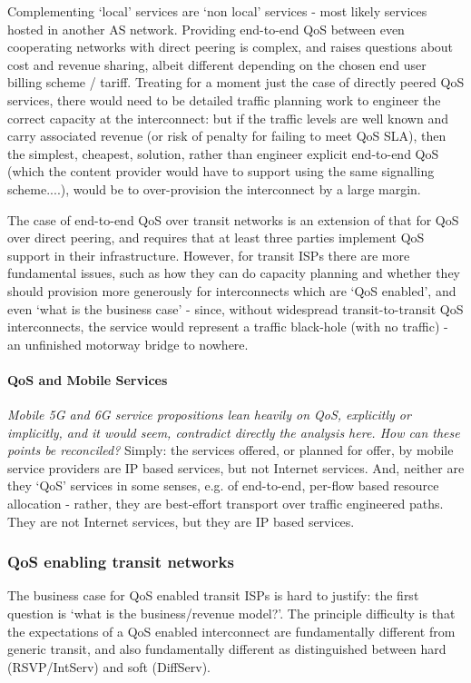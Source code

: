 Complementing ‘local’ services are ‘non local’ services - most likely services hosted in another AS network.
Providing end-to-end QoS between even cooperating networks with direct peering is complex, and raises questions about cost and revenue sharing, albeit different depending on the chosen end user billing scheme / tariff.
Treating for a moment just the case of directly peered QoS services, there would need to be detailed traffic planning work to engineer the correct capacity at the interconnect: but if the traffic levels are well known and carry associated revenue (or risk of penalty for failing to meet QoS SLA), then the simplest, cheapest, solution, rather than engineer explicit end-to-end QoS (which the content provider would have to support using the same signalling scheme....), would be to over-provision the interconnect by a large margin.

The case of end-to-end QoS over transit networks is an extension of that for QoS over direct peering, and requires that at least three parties implement QoS support in their infrastructure.
However, for transit ISPs there are more fundamental issues, such as how they can do capacity planning and whether they should provision more generously for interconnects which are ‘QoS enabled’, and even ‘what is the business case’ - since, without widespread transit-to-transit QoS interconnects, the service would represent a traffic black-hole (with no traffic) - an unfinished motorway bridge to nowhere.
\paragraph{QoS and Mobile Services}
\textit{Mobile 5G and 6G service propositions lean heavily on QoS, explicitly or implicitly, and it would seem, contradict directly the analysis here.  How can these points be reconciled?}  Simply: the services offered, or planned for offer, by mobile service providers are IP based services, but not Internet services.  And, neither are they `QoS' services in some senses, e.g. of end-to-end, per-flow based resource allocation - rather, they are best-effort transport over traffic engineered paths.   They are not Internet services, but they are IP based services.

\subsubsection{QoS enabling transit networks}

The business case for QoS enabled transit ISPs is hard to justify: the first question is ‘what is the business/revenue model?’.
The principle difficulty is that the expectations of a QoS enabled interconnect are fundamentally different from generic transit, and also fundamentally different as distinguished between hard (RSVP/IntServ) and soft (DiffServ).

